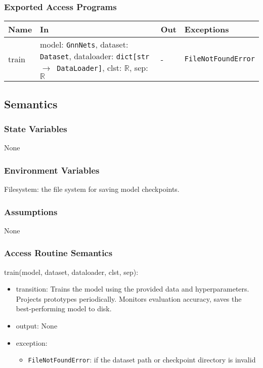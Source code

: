 \documentclass[12pt, titlepage]{article}
\begin{document}
\subsubsection{Exported Access Programs}

\begin{center}
\begin{tabular}{p{2cm} p{6cm} p{4cm} p{3.5cm}}
\hline
\textbf{Name} & \textbf{In} & \textbf{Out} & \textbf{Exceptions} \\
\hline
train & model: \texttt{GnnNets}, dataset: \texttt{Dataset}, dataloader: \texttt{dict[str \(\rightarrow\) DataLoader]}, clst: \(\mathbb{R}\), sep: \(\mathbb{R}\) & - & \texttt{FileNotFoundError} \\
\hline
\end{tabular}
\end{center}

\subsection{Semantics}

\subsubsection{State Variables}
None

\subsubsection{Environment Variables}
Filesystem: the file system for saving model checkpoints.

\subsubsection{Assumptions}
None

\subsubsection{Access Routine Semantics}

\noindent train(model, dataset, dataloader, clst, sep):
\begin{itemize}
\item transition: Trains the model using the provided data and hyperparameters. Projects prototypes periodically. Monitors evaluation accuracy, saves the best-performing model to disk.
\item output: None
\item exception:     
    \begin{itemize}
        \item \texttt{FileNotFoundError}: if the dataset path or checkpoint directory is invalid
    \end{itemize}
\end{itemize}
\end{document}
